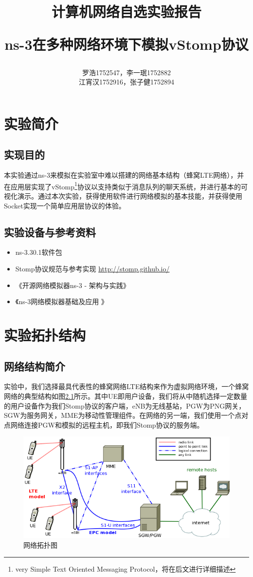 \documentclass{ctexrep}
\title{\textbf{计算机网络自选实验报告} \\ [2ex] \begin{large} ns-3在多种网络环境下模拟vStomp协议 \end{large} }
\author{罗浩1752547，李一珉1752882\\江宵汉1752916，张子健1752894}
\date{}
\begin{document}
	\maketitle
	\tableofcontents
	
	\chapter{实验简介}
	\section{实现目的}
	本实验通过ns-3来模拟在实验室中难以搭建的网络基本结构（蜂窝LTE网络），并在应用层实现了vStomp\footnote{very Simple Text Oriented Messaging Protocol，将在后文进行详细描述}协议以支持类似于消息队列的聊天系统，并进行基本的可视化演示。通过本次实验，获得使用软件进行网络模拟的基本技能，并获得使用Socket实现一个简单应用层协议的体验。
	\section{实验设备与参考资料}
	\begin{itemize}
		\item ns-3.30.1软件包
		\item Stomp协议规范与参考实现 \url{http://stomp.github.io/}
		\item 《开源网络模拟器ns-3 - 架构与实践》
		\item 《ns-3网络模拟器基础及应用 》
	\end{itemize}
	\chapter{实验拓扑结构}
	\section{网络结构简介}
	实验中，我们选择最具代表性的蜂窝网络LTE结构来作为虚拟网络环境，一个蜂窝网络的典型结构如图\ref{fig:topology}所示。其中UE即用户设备，我们将从中随机选择一定数量的用户设备作为我们Stomp协议的客户端，eNB为无线基站，PGW为PNG网关，SGW为服务网关，MME为移动性管理组件。在网络的另一端，我们使用一个点对点网络连接PGW和模拟的远程主机，即我们Stomp协议的服务端。
	\begin{figure}[H]
		\centering
		\includegraphics[width=0.9\linewidth]{img/topology}
		\caption{网络拓扑图}
		\label{fig:topology}
	\end{figure}
	
\end{document}
